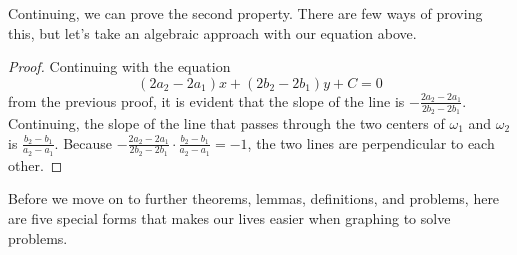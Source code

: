 \documentclass[../../../main.tex]{subfiles}
\begin{document}
Continuing, we can prove the second property. There are few ways of
proving this, but let's take an algebraic approach with our equation
above.

\begin{proof}
Continuing with the equation
\[
(2a_2 - 2a_1) x + (2b_2 - 2b_1) y + C = 0
\]
from the previous proof, it is evident that the slope of the line
is $-\frac{2a_2 - 2a_1}{2b_2 - 2b_1}$. Continuing, the slope of
the line that passes through the two centers of $\omega_1$ and
$\omega_2$ is $\frac{b_2 - b_1}{a_2 - a_1}$. Because
$-\frac{2a_2 - 2a_1}{2b_2 - 2b_1} \cdot \frac{b_2 - b_1}{a_2 - a_1}
= -1$, the two lines are perpendicular to each other.
\end{proof}

Before we move on to further theorems, lemmas, definitions, and
problems, here are five special forms that makes our lives easier
when graphing to solve problems.

\begin{minipage}{0.48\textwidth}
\begin{figure}[H]
\centering
{}
\end{figure}
\end{minipage}
\hfill
\begin{minipage}{0.48\textwidth}
\begin{figure}[H]
\centering
{}
\end{figure}
\end{minipage}
\end{document}
